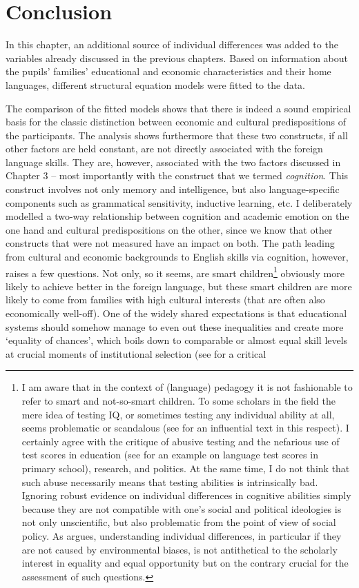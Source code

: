 \documentclass[output=paper]{langsci/langscibook}
\begin{document}
\section{Conclusion}

In this chapter, an additional source of individual differences was added to the variables already discussed in the previous chapters. Based on information about the pupils’ families’ educational and economic characteristics and their home languages, different structural equation models were fitted to the data.

The comparison of the fitted models shows that there is indeed a sound empirical basis for the classic distinction between economic and cultural predispositions of the participants. The analysis shows furthermore that these two constructs, if all other factors are held constant, are not directly associated with the foreign language skills. They are, however, associated with the two factors discussed in Chapter 3 -- most importantly with the construct that we termed \textit{cognition}. This construct involves not only memory and intelligence, but also language-specific components such as grammatical sensitivity, inductive learning, etc. I deliberately modelled a two-way relationship between cognition and academic emotion on the one hand and cultural predispositions on the other, since we know that other constructs that were not measured have an impact on both. The path leading from cultural and economic backgrounds to English skills via cognition, however, raises a few questions. Not only, so it seems, are smart children\footnote{I am aware that in the context of (language) pedagogy it is not fashionable to refer to smart and not-so-smart children. To some scholars in the field the mere idea of testing IQ, or sometimes testing any individual ability at all, seems problematic or scandalous (see \citealt[186]{Foucault1975} for an influential text in this respect). I certainly agree with the critique of abusive testing and the nefarious use of test scores in education (see \citealt{KuhnMai2015} for an example on language test scores in primary school), research, and politics. At the same time, I do not think that such abuse necessarily means that testing abilities is intrinsically bad. Ignoring robust evidence on individual differences in cognitive abilities simply because they are not compatible with one’s social and political ideologies is not only unscientific, but also problematic from the point of view of social policy. As \citet[chapter 9]{Plomin2019} argues, understanding individual differences, in particular if they are not caused by environmental biases, is not antithetical to the scholarly interest in equality and equal opportunity but on the contrary crucial for the assessment of such questions.} obviously more likely to achieve better in the foreign language, but these smart children are more likely to come from families with high cultural interests (that are often also economically well-off). One of the widely shared expectations is that educational systems should somehow manage to even out these inequalities and create more ‘equality of chances’, which boils down to comparable or almost equal skill levels at crucial moments of institutional selection (see \citealt{Heid1988} for a critical 
\end{document}
